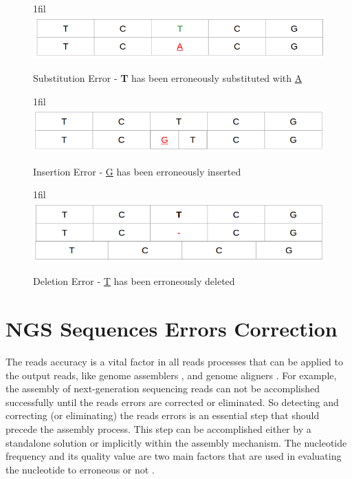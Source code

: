 \documentclass[12pt,openany]{llncs}
\makeatletter
\newcommand*{\centerfloat}{%
  \parindent \z@
  \leftskip \z@ \@plus 1fil \@minus \textwidth
  \rightskip\leftskip
  \parfillskip \z@skip}
\makeatother
\begin{document}
\begin{figure}
	\centerfloat
	\includegraphics[width=1\linewidth]{./figs/ErrCrr-1}
	\caption{\label{fig:fig-ErrCrr-1}{Substitution Error} - \textbf{T} has been erroneously substituted with \underline{A}}
\end{figure}
\vspace{2cm}
\begin{figure}
	\centerfloat
	\includegraphics[width=1\linewidth]{./figs/ErrCrr-2}
	\caption{\label{fig:fig-ErrCrr-2}{Insertion Error} - \underline{G} has been erroneously inserted}
\end{figure}
\vspace{2cm}
\begin{figure}
	\centerfloat
	\includegraphics[width=1\linewidth]{./figs/ErrCrr-3}
	\caption{\label{fig:fig-ErrCrr-3}{Deletion Error} - \underline{T} has been erroneously deleted}
\end{figure}


\section{NGS Sequences Errors Correction}
The reads accuracy is a vital factor in all reads processes that can be applied to the output reads, like genome assemblers \cite{assembly,assembly1}, and genome aligners \cite{alignment}. For example, the assembly of next-generation sequencing reads can not be accomplished successfully until the reads errors are corrected or eliminated. So detecting and correcting (or eliminating) the reads errors is an essential step that should precede the assembly process. This step can be accomplished either by a standalone solution or implicitly within the assembly mechanism. The nucleotide frequency and its quality value are two main factors that are used in evaluating the nucleotide to erroneous or not \cite{ErrCorr,ErrCorr1}. 
\end{document}
